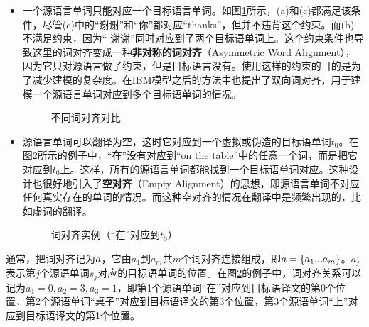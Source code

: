 \begin{itemize}
\vspace{0.5em}
\item 一个源语言单词只能对应一个目标语言单词。如图\ref{fig:5-15}所示，(a)和(c)都满足该条件，尽管(c)中的“谢谢”和“你”都对应“thanks”，但并不违背这个约束。而(b)不满足约束，因为“ 谢谢”同时对应到了两个目标语单词上。这个约束条件也导致这里的词对齐变成一种{\small\sffamily\bfseries{非对称的词对齐}}（Asymmetric Word Alignment），因为它只对源语言做了约束，但是目标语言没有。使用这样的约束的目的是为了减少建模的复杂度。在IBM模型之后的方法中也提出了双向词对齐，用于建模一个源语言单词对应到多个目标语单词的情况。

\begin{figure}[htp]
    \centering

\setlength{\belowcaptionskip}{-0.5em}
    \caption{不同词对齐对比}
    \label{fig:5-15}
\end{figure}

\item 源语言单词可以翻译为空，这时它对应到一个虚拟或伪造的目标语单词$t_0$。在图\ref{fig:5-16}所示的例子中，“在”没有对应到“on the table”中的任意一个词，而是把它对应到$t_0$上。这样，所有的源语言单词都能找到一个目标语单词对应。这种设计也很好地引入了{\small\sffamily\bfseries{空对齐}}（Empty Alignment）的思想，即源语言单词不对应任何真实存在的单词的情况。而这种空对齐的情况在翻译中是频繁出现的，比如虚词的翻译。

\begin{figure}[htp]
    \centering

\setlength{\belowcaptionskip}{-0.5em}
    \caption{词对齐实例（“在”对应到$t_0$）}
    \label{fig:5-16}
\end{figure}
\end{itemize}

\parinterval 通常，把词对齐记为${a}$，它由$a_1$到$a_m$共$m$个词对齐连接组成，即${a}=\{ a_1...a_m \}$。$a_j$表示第$j$个源语单词$s_j$对应的目标语单词的位置。在图\ref{fig:5-16}的例子中，词对齐关系可以记为$a_1=0, a_2=3, a_3=1$，即第1个源语单词“在”对应到目标语译文的第0个位置，第2个源语单词“桌子”对应到目标语译文的第3个位置，第3个源语单词“上”对应到目标语译文的第1个位置。

